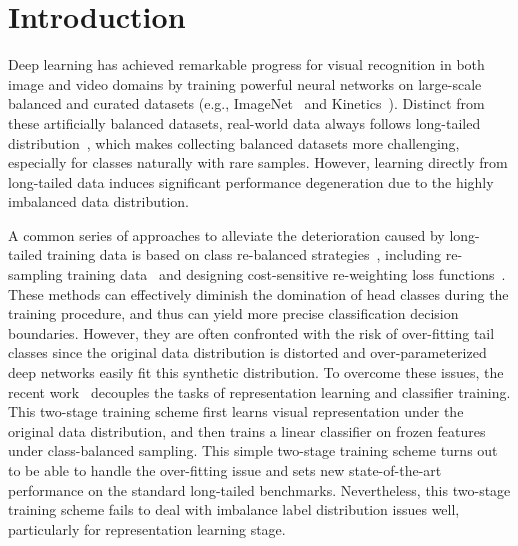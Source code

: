 \documentclass[10pt,twocolumn,letterpaper]{article}
\begin{document}
\section{Introduction}
Deep learning has achieved remarkable progress for visual recognition in both image and video domains by training powerful neural networks on large-scale balanced and curated datasets (e.g., ImageNet~\cite{ImageNet} and Kinetics~\cite{kinetics}). Distinct from these artificially balanced datasets, real-world data always follows long-tailed distribution~\cite{longtail, weak}, which makes collecting balanced datasets more challenging, especially for classes naturally with rare samples. However, learning directly from long-tailed data induces significant performance degeneration due to the highly imbalanced data distribution.

A common series of approaches to alleviate the deterioration caused by long-tailed training data is based on class re-balanced strategies~\cite{oversample_2, costsensitive, LDAM, undersampling_1, oversampling_3}, including re-sampling training data~\cite{oversample_2, undersampling_1, featureaugmentation, oversampling_3} and designing cost-sensitive re-weighting loss functions~\cite{costsensitive, reweight_2}. These methods can effectively diminish the domination of head classes during the training procedure, and thus can yield more precise classification decision boundaries. However, they are often confronted with the risk of over-fitting tail classes since the original data distribution is distorted and over-parameterized deep networks easily fit this synthetic distribution. To overcome these issues, the recent work~\cite{decoupling, bbn} decouples the tasks of representation learning and classifier training. This two-stage training scheme first learns visual representation under the original data distribution, and then trains a linear classifier on frozen features under class-balanced sampling. This simple two-stage training scheme turns out to be able to handle the over-fitting issue and sets new state-of-the-art performance on the standard long-tailed benchmarks. Nevertheless, this two-stage training scheme fails to deal with imbalance label distribution issues well, particularly for representation learning stage.
\end{document}
